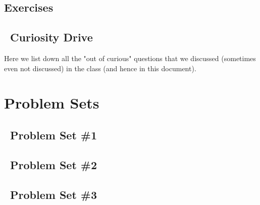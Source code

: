 \documentclass[11pt]{report}
\begin{document}
\section{Exercises}
\setcounter{excount}{0}

\newpage

\section{~Curiosity Drive}
Here we list down all the "out of curious" questions that we discussed (sometimes even not discussed) in the class (and hence in this document).

\def\psetbackref{0}

\chapter{Problem Sets}

\section{~Problem Set \#1}
\begin{enumerate}[(1)]
\end{enumerate}

\newpage
\section{~Problem Set \#2}

\begin{enumerate}[(1)]
\end{enumerate}

\newpage
\section{~Problem Set \#3}

\begin{enumerate}[(1)]
\end{enumerate}
%
%



\end{document}
